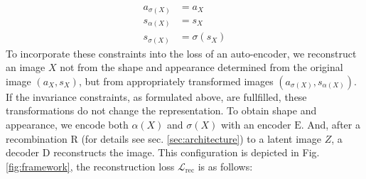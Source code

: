 \begin{align}
 a_{\sigma(X)}  &= a_{X} \tag{invariance of appearance}\\
  s_{\alpha(X)} &= s_X  \tag{invariance of shape}\\
  s_{\sigma(X)} &= \sigma(s_X) \tag{equivariance of shape}
\label{eq:invar}
\end{align} %
To incorporate these constraints into the loss of an auto-encoder, we reconstruct an image $X$ not from the shape and appearance determined from the original image $(a_X, s_X)$, but from appropriately transformed images $(a_{\sigma(X)}, s_{\alpha(X)})$. If the invariance constraints, as formulated above, are fullfilled, these transformations do not change the representation. To obtain shape and appearance, we encode both $\alpha(X)$ and $\sigma(X)$ with an encoder $\mathrm{E}$. And, after a recombination $\mathrm{R}$ (for details see sec. \ref{sec:architecture}) to a latent image $Z$, a decoder $\mathrm{D}$ reconstructs the image. This configuration is depicted in Fig. \ref{fig:framework}, the reconstruction loss $\mathcal{L}_{\textrm{rec}}$ is as follows:

